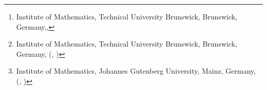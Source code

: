 \author{
Dorian Hillebrand\thanks{Institute of Mathematics, Technical University Brunswick, Brunswick, Germany,, 
}
\and 
Simon-Christian Klein\thanks{Institute of Mathematics, Technical University Brunswick, Brunswick, Germany, (, )}
\and 
Philipp \"Offner\thanks{Institute of Mathematics, Johannes Gutenberg University, Mainz, Germany, (, )} 
}


\newcommand{\todo}[1]{{\Large \textcolor{red}{#1}}}
\newcommand{\revA}[1]{{\color{red}#1}}
\newcommand{\revB}[1]{{\color{blue}#1}}
\newcommand{\revC}[1]{{\color{cyan}#1}}
\newcommand{\JN}[1]{{\color{red}#1}}
\newcommand{\SK}[1]{{\color{blue}#1}}
\newcommand{\PO}[1]{{\color{cyan}#1}}


\newenvironment{eq}{\begin{equation}}{\end{equation}} 
\DeclareMathOperator{\rank}{rank}
\DeclareMathOperator{\diag}{diag}
\DeclareMathOperator*{\argmin}{arg\,min} 
\newcommand{\scp}[2]{\left\langle{#1, #2}\right\rangle} 
\newcommand{\Span}{\mathrm{span}}
\newcommand{\LS}{\mathrm{LS}}
\renewcommand{\dim}{\mathrm{dim} \,}
\newcommand{\vd}{\mathrm{d}}
\newcommand{\intd}{\, \mathrm{d}}
\newcommand{\N}{\mathbb{N}}
\newcommand{\Z}{\mathbb{Z}}
\newcommand{\R}{\mathbb{R}} 
\renewcommand{\epsilon}{\varepsilon}

\renewcommand{\div}{\operatorname{div}}
\newcommand{\bu}{\mathbf{u}}
\newcommand{\bx}{\mathbf{x}}
\newcommand{\fnum}{f^{\mathrm{num}}}
\newcommand{\fprec}{f^{n,\mathrm{precise}}}
\newcommand{\fn}{f^{ n}}
\newcommand{\fnn}{f^{n, \mathrm{num}}}
\newcommand{\fnnnn}{f^{n, \mathrm{neural}}}
\newcommand{\Fnum}{F^{\mathrm{num}}}
\newcommand{\Fnn}{F^n}
\newcommand{\uinit}{\mathcal{I}}
\newcommand{\meshT}{\mathcal{T}}
\newcommand{\nquad}{\mathrm{I}}


\newcommand{\of}[1]{\left (#1 \right)}
\newcommand{\derive}[2] {\frac{\partial {#1} }{\partial {#2}}}
\newcommand{\derd}[2]{\frac{\vd {#1}}{\vd {#2}}}

\DeclareMathOperator{\ch}{conv}
\DeclareMathOperator{\PR}{P}
\DeclareMathOperator{\ran}{ran}

